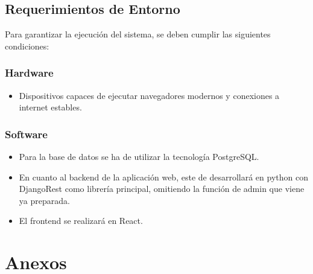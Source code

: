 \documentclass{report}
\begin{document}
        \vspace{1cm}

        \subsection*{Requerimientos de Entorno}

            Para garantizar la ejecución del sistema, se deben cumplir las siguientes condiciones:

            \subsubsection{Hardware}
            \begin{itemize}
                \item Dispositivos capaces de ejecutar navegadores modernos y conexiones a internet estables.
            \end{itemize}
            
            \subsubsection{Software}
            \begin{itemize}
                \item Para la base de datos se ha de utilizar la tecnología PostgreSQL.
                \item En cuanto al backend de la aplicación web, este de desarrollará en python con DjangoRest como 
                librería principal, omitiendo la función de admin que viene ya preparada.
                \item El frontend se realizará en React.
            \end{itemize}

    \newpage

    \section*{Anexos}
\end{document}
